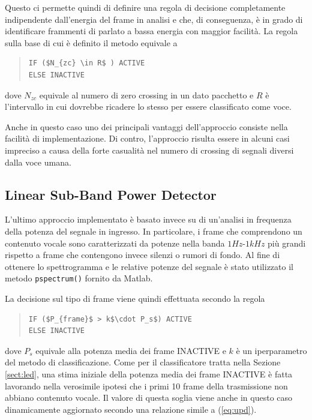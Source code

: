 \documentclass[10pt,twocolumn]{article}
\begin{document}
{\vspace{0.1cm}
Questo ci permette quindi di definire una regola di decisione completamente indipendente dall'energia del frame
in analisi e che, di conseguenza, è in grado di identificare frammenti di parlato a bassa energia con maggior
facilità. La regola sulla base di cui è definito il metodo equivale a
\begin{quote}
\begin{lstlisting}
IF ($N_{zc} \in R$ ) ACTIVE
ELSE INACTIVE
\end{lstlisting}
\end{quote}
dove $N_{zc}$ equivale al numero di zero crossing in un dato pacchetto e $R$ è l'intervallo in cui dovrebbe ricadere lo stesso per essere classificato come voce.

\vspace{0.1cm}
Anche in questo caso uno dei principali vantaggi dell'approccio consiste nella facilità di implementazione. Di
contro, l'approccio risulta essere in alcuni casi impreciso a causa della forte casualità nel numero di crossing
di segnali diversi dalla voce umana.

\subsection{Linear Sub-Band Power Detector}
L'ultimo approccio implementato è basato invece su di un'analisi in frequenza della potenza del segnale in ingresso. In particolare, i frame che comprendono un contenuto vocale sono caratterizzati da potenze nella
banda $1Hz$-$1kHz$ più grandi rispetto a frame che contengono invece silenzi o rumori di fondo. Al fine di
ottenere lo spettrogramma e le relative potenze del segnale è stato utilizzato il metodo \texttt{pspectrum()}
fornito da Matlab.

\vspace{0.1cm}
La decisione sul tipo di frame viene quindi effettuata secondo la regola
\begin{quote}
\begin{lstlisting}
IF ($P_{frame}$ > k$\cdot P_s$) ACTIVE
ELSE INACTIVE
\end{lstlisting}
\end{quote}
\vspace{-0.2cm}
dove $P_s$ equivale alla potenza media dei frame INACTIVE e $k$ è un iperparametro del metodo di classificazione.
Come per il classificatore tratta nella Sezione \ref{sect:led}, una stima iniziale della potenza media dei frame INACTIVE è fatta lavorando nella verosimile ipotesi che i primi
10 frame della trasmissione non abbiano contenuto vocale. 
Il valore di questa soglia viene anche in questo caso dinamicamente aggiornato secondo una relazione simile a (\ref{eq:upd}).

}
\end{document}
